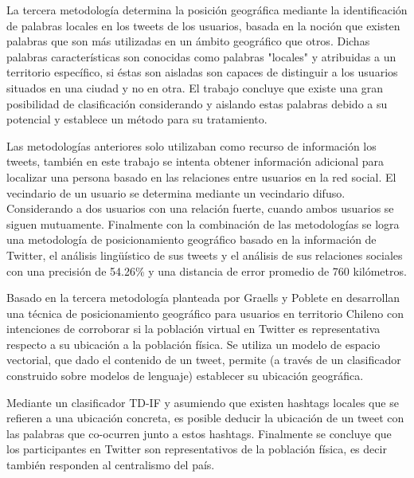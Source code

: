 La tercera metodología determina la posición geográfica mediante la identificación de palabras locales en los tweets de los usuarios, basada en la noción que existen palabras que son más utilizadas en un ámbito geográfico que otros. Dichas palabras características son conocidas como palabras "locales" y atribuidas a un territorio específico, si éstas son aisladas son capaces de distinguir a los usuarios situados en una ciudad y no en otra. El trabajo concluye que existe una gran posibilidad de clasificación considerando y aislando estas palabras debido a su potencial y establece un método para su tratamiento. 

Las metodologías anteriores solo utilizaban como recurso de información los tweets, también en este trabajo se intenta obtener información adicional para localizar una persona basado en las relaciones entre usuarios en la red social. El vecindario de un usuario se determina mediante un vecindario difuso. Considerando a dos usuarios con una relación fuerte, cuando ambos usuarios se siguen mutuamente. Finalmente con la combinación de las metodologías se logra una metodología de posicionamiento geográfico basado en la información de Twitter, el análisis lingüístico de sus tweets y el análisis de sus relaciones sociales con una precisión de 54.26\% y una distancia de error promedio de 760 kilómetros.

Basado en la tercera metodología planteada por  \cite{Cheng:2010:YYT:1871437.1871535}  Graells y Poblete en \cite{GraellsGarridoP13} desarrollan una técnica de posicionamiento geográfico para usuarios en territorio Chileno con intenciones de corroborar si la población virtual en Twitter es representativa respecto a su ubicación a la población física. Se utiliza un modelo de espacio vectorial, que dado el contenido de un tweet, permite (a través de un clasificador construido sobre modelos de lenguaje) establecer su ubicación geográfica. 

Mediante un clasificador TD-IF y asumiendo que existen hashtags locales que se refieren a una ubicación concreta, es posible deducir la ubicación de un tweet con las palabras que co-ocurren junto a estos hashtags. Finalmente se concluye que los participantes en Twitter son representativos de la población física, es decir también responden al centralismo del país.


